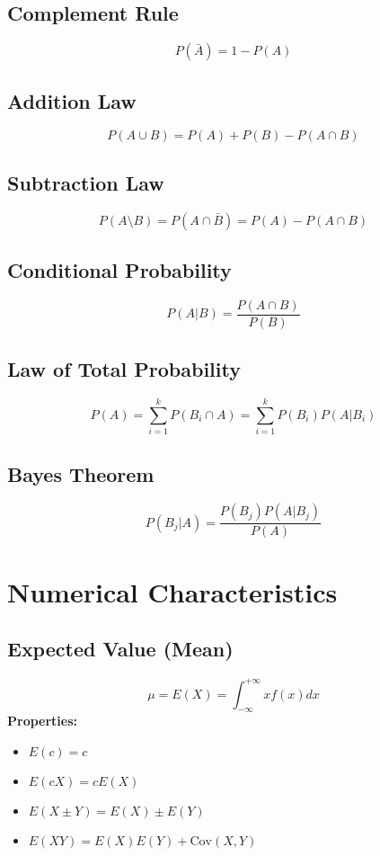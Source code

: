 \documentclass{article}
\begin{document}
\subsection{Complement Rule}
\[
    P(\bar{A}) = 1 - P(A)
\]

\subsection{Addition Law}
\[
    P(A \cup B) = P(A) + P(B) - P(A \cap B)
\]

\subsection{Subtraction Law}
\[
    P(A \setminus B) = P(A \cap \bar{B}) = P(A) - P(A \cap B)
\]

\subsection{Conditional Probability}
\[
    P(A|B) = \frac{P(A \cap B)}{P(B)}
\]

\subsection{Law of Total Probability}
\[
    P(A) = \sum_{i=1}^{k} P(B_i \cap A) = \sum_{i=1}^{k} P(B_i)P(A|B_i)
\]

\subsection{Bayes Theorem}
\[
    P(B_j|A) = \frac{P(B_j)P(A|B_j)}{P(A)}
\]

\newpage
\section{Numerical Characteristics}

\subsection{Expected Value (Mean)}
\[
    \mu = E(X) = \int_{-\infty}^{+\infty} x f(x) dx
\]
\textbf{Properties:}
\begin{itemize}
    \item \( E(c) = c \)
    \item \( E(cX) = cE(X) \)
    \item \( E(X \pm Y) = E(X) \pm E(Y) \)
    \item \( E(XY) = E(X)E(Y) + \text{Cov}(X,Y) \)
\end{itemize}
\end{document}
